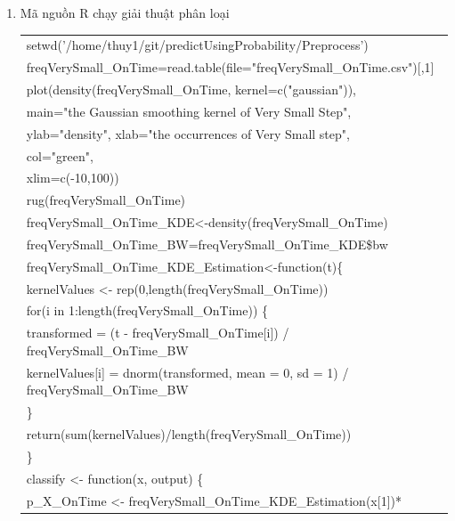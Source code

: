 \documentclass[a4paper, 13pt]{report}
\begin{document}
\begin{enumerate}[label=\textbf{PL\arabic*}]
\item \label{phanloaiR} Mã nguồn R chạy giải thuật phân loại
\begin{flushleft}
\begin{tabular}{  |l| }
\hline 
setwd('/home/thuy1/git/predictUsingProbability/Preprocess')\\
freqVerySmall\_OnTime=read.table(file="freqVerySmall\_OnTime.csv")[,1]\\
plot(density(freqVerySmall\_OnTime, kernel=c("gaussian")),\\
\hspace{1cm}     main="the Gaussian smoothing kernel of Very Small Step",\\
\hspace{1cm}     ylab="density", xlab="the occurrences of Very Small step",\\
\hspace{1cm}     col="green",\\
\hspace{1cm}     xlim=c(-10,100))\\
rug(freqVerySmall\_OnTime)\\
freqVerySmall\_OnTime\_KDE<-density(freqVerySmall\_OnTime)\\
freqVerySmall\_OnTime\_BW=freqVerySmall\_OnTime\_KDE\$bw\\
freqVerySmall\_OnTime\_KDE\_Estimation<-function(t)\{\\
\hspace{0.5cm}  kernelValues <- rep(0,length(freqVerySmall\_OnTime))\\
\hspace{0.5cm}  for(i in 1:length(freqVerySmall\_OnTime)) \{\\
\hspace{1cm}    transformed = (t - freqVerySmall\_OnTime[i]) / freqVerySmall\_OnTime\_BW\\
\hspace{1cm}    kernelValues[i] = dnorm(transformed, mean = 0, sd = 1) / freqVerySmall\_OnTime\_BW\\
\hspace{0.5cm}  \}\\
\hspace{0.5cm}  return(sum(kernelValues)/length(freqVerySmall\_OnTime))\\
\}\\
classify <- function(x, output) \{\\
\hspace{1cm}  p\_X\_OnTime <- freqVerySmall\_OnTime\_KDE\_Estimation(x[1])*\\

\end{tabular}
\end{flushleft}
\end{enumerate}
\end{document}
